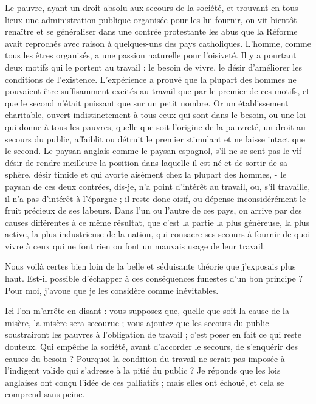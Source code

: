 \documentclass[french,twoside]{book} %
\begin{document}
Le pauvre, ayant un droit absolu aux secours de la société, et trouvant en tous lieux une administration publique organisée pour les lui fournir, on vit bientôt renaître et se généraliser dans une contrée protestante les abus que la Réforme avait reprochés avec raison à quelques-uns des pays catholiques. L'homme, comme tous les êtres organisés, a une passion naturelle pour l’oisiveté. Il y a pourtant deux motifs qui le portent au travail : le besoin de vivre, le désir d’améliorer les conditions de l’existence. L’expérience a prouvé que la plupart des hommes ne pouvaient être suffisamment excités au travail que par le premier de ces motifs, et que le second n’était puissant que sur un petit nombre. Or un établissement charitable, ouvert indistinctement à tous ceux qui sont dans le besoin, ou une loi qui donne à tous les pauvres, quelle que soit l’origine de la pauvreté, un droit au secours du public, affaiblit ou détruit le premier stimulant et ne laisse intact que le second. Le paysan anglais comme le paysan espagnol, s’il ne se sent pas le vif désir de rendre meilleure la position dans laquelle il est né et de sortir de sa sphère, désir timide et qui avorte aisément chez la plupart des hommes, - le paysan de ces deux contrées, dis-je, n’a point d’intérêt au travail, ou, s’il travaille, il n’a pas d’intérêt à l’épargne ; il reste donc oisif, ou dépense inconsidérément le fruit précieux de ses labeurs. Dans l’un ou l’autre de ces pays, on arrive par des causes différentes à ce même résultat, que c’est la partie la plus généreuse, la plus active, la plus industrieuse de la nation, qui consacre ses secours à fournir de quoi vivre à ceux qui ne font rien ou font un mauvais usage de leur travail.\par
\bigbreak
\noindent Nous voilà certes bien loin de la belle et séduisante théorie que j’exposais plus haut. Est-il possible d’échapper à ces conséquences funestes d’un bon principe ? Pour moi, j’avoue que je les considère comme inévitables.\par
\bigbreak
\noindent Ici l’on m’arrête en disant : vous supposez que, quelle que soit la cause de la misère, la misère sera secourue ; vous ajoutez que les secours du public soustrairont les pauvres à l’obligation de travail ; c’est poser en fait ce qui reste douteux. Qui empêche la société, avant d’accorder le secours, de s’enquérir des causes du besoin ? Pourquoi la condition du travail ne serait pas imposée à l’indigent valide qui s’adresse à la pitié du public ? Je réponds que les lois anglaises ont conçu l’idée de ces palliatifs ; mais elles ont échoué, et cela se comprend sans peine.\par
\end{document}

